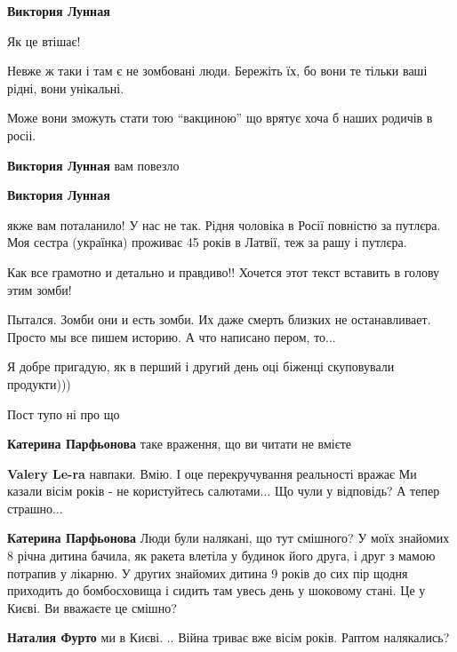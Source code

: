 \begin{itemize}
\begin{itemize} %
\textbf{Виктория Лунная}

Як це втішає!

Невже ж таки і там є не зомбовані люди. Бережіть їх, бо вони те тільки ваші
рідні, вони унікальні.

Може вони зможуть стати тою \enquote{вакциною} що врятує хоча б наших родичів в росіі.

\textbf{Виктория Лунная} вам повезло

\textbf{Виктория Лунная} 

якже вам поталанило! У нас не так. Рідня чоловіка в Росії повністю за путлєра.
Моя сестра (українка) проживає 45 років в Латвії, теж за рашу і путлєра.

\end{itemize} %


Как все грамотно и детально и правдиво!! Хочется этот текст вставить в голову
этим зомби!


Пытался. Зомби они и есть зомби. Их даже смерть близких не останавливает.
Просто мы все пишем историю. А что написано пером, то...


Я добре пригадую, як в перший і другий день оці біженці скуповували продукти)))

Пост тупо ні про що

\begin{itemize} %
\textbf{Катерина Парфьонова} таке враження, що ви читати не вмієте

\textbf{Valery Le-ra} навпаки. Вмію.
І оце перекручування реальності вражає
Ми казали вісім років - не користуйтесь салютами...
Що чули у відповідь?
А тепер страшно...

\textbf{Катерина Парфьонова} Люди були налякані, що тут смішного? У моїх знайомих 8 річна дитина бачила, як ракета влетіла у будинок його друга, і друг з мамою потрапив у лікарню. У других знайомих дитина 9 років до сих пір щодня приходить до бомбосховища і сидить там увесь день у шоковому стані. Це у Києві. Ви вважаєте це смішно?

\begin{itemize} %
\textbf{Наталия Фурто} ми в Києві.
..
Війна триває вже вісім років.
Раптом налякались?


\end{itemize}
\end{itemize}
\end{itemize}
